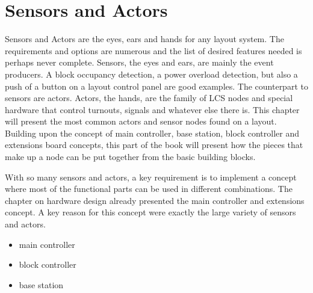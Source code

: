 \chapter*{Sensors and Actors}

Sensors and Actors are the eyes, ears and hands for any layout system. The requirements and options are numerous and the list of desired features needed is perhaps never complete. Sensors, the eyes and ears, are mainly the event producers. A block occupancy detection, a power overload detection, but also a push of a button on a layout control panel are good examples. The counterpart to sensors  are actors. Actors, the hands, are the family of LCS nodes and special hardware that control turnouts, signals and whatever else there is. This chapter will present the most common actors and sensor nodes found on a layout. Building upon the concept of main controller, base station, block controller and extensions board concepts, this part of the book will present how the pieces that make up a node can be put together from the basic building blocks.

With so many sensors and actors, a key requirement is to implement a concept where most of the functional parts can be used in different combinations. The chapter on hardware design already presented the main controller and extensions concept. A key reason for this concept were exactly the large variety of sensors and actors.

\begin{itemize}
\item main controller
\item block controller
\item base station
\end{itemize}

